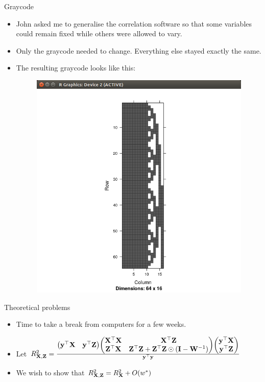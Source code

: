 \documentclass{beamer}
\begin{document}
\begin{frame}{Graycode}
\begin{itemize}
\item John asked me to generalise the correlation software so that some variables could remain fixed
			while others were allowed to vary.
\item Only the graycode needed to change. Everything else stayed exactly the same.
\item The resulting graycode looks like this:
\begin{figure}
\includegraphics[scale=.2]{Graycode_fixed.png}
\end{figure}
\end{itemize}
\end{frame}

\begin{frame}{Theoretical problems}
\begin{itemize}
\item Time to take a break from computers for a few weeks.
\item Let $R^2_{{\bf X}, {\bf Z}} = \frac{
\begin{pmatrix}
{\bf y}^\top {\bf X} & {\bf y}^\top {\bf Z}
\end{pmatrix}
\begin{pmatrix}
{\bf X}^\top {\bf X} & {\bf X}^\top {\bf Z} \\
{\bf Z}^\top {\bf X} & {\bf Z}^\top {\bf Z} + {\bf Z}^\top {\bf Z} \odot ({\bf I} - {\bf W}^{-1})
\end{pmatrix}
\begin{pmatrix}
{\bf y}^\top {\bf X}\\
{\bf y}^\top {\bf Z}
\end{pmatrix}
}{{\bf y}^\top {\bf y}}$
\item We wish to show that $R^2_{{\bf X}, {\bf Z}} = R^2_{\bf X} + O(w^*)$
\end{itemize}
\end{frame}
\end{document}

